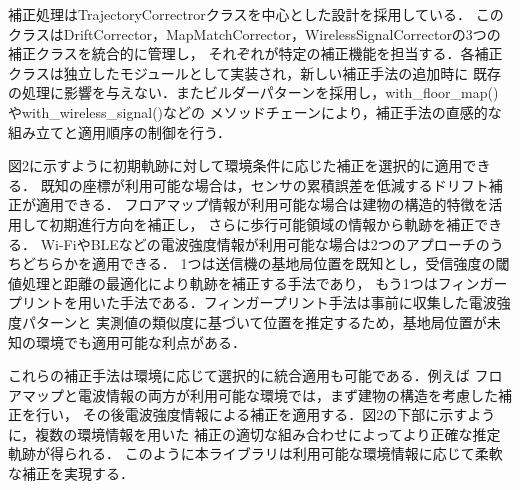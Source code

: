 \documentclass[a4paper, 10pt, twocolumn]{jarticle}
\begin{document}
補正処理はTrajectoryCorrectrorクラスを中心とした設計を採用している．
このクラスはDriftCorrector，MapMatchCorrector，WirelessSignalCorrectorの3つの補正クラスを統合的に管理し，
それぞれが特定の補正機能を担当する．各補正クラスは独立したモジュールとして実装され，新しい補正手法の追加時に
既存の処理に影響を与えない．またビルダーパターンを採用し，with\_floor\_map()やwith\_wireless\_signal()などの
メソッドチェーンにより，補正手法の直感的な組み立てと適用順序の制御を行う．

図2に示すように初期軌跡に対して環境条件に応じた補正を選択的に適用できる．
既知の座標が利用可能な場合は，センサの累積誤差を低減するドリフト補正が適用できる．
フロアマップ情報が利用可能な場合は建物の構造的特徴を活用して初期進行方向を補正し，
さらに歩行可能領域の情報から軌跡を補正できる．
Wi-FiやBLEなどの電波強度情報が利用可能な場合は2つのアプローチのうちどちらかを適用できる．
1つは送信機の基地局位置を既知とし，受信強度の閾値処理と距離の最適化により軌跡を補正する手法であり，
もう1つはフィンガープリントを用いた手法である．フィンガープリント手法は事前に収集した電波強度パターンと
実測値の類似度に基づいて位置を推定するため，基地局位置が未知の環境でも適用可能な利点がある．


これらの補正手法は環境に応じて選択的に統合適用も可能である．例えば
フロアマップと電波情報の両方が利用可能な環境では，まず建物の構造を考慮した補正を行い，
その後電波強度情報による補正を適用する．図2の下部に示すように，複数の環境情報を用いた
補正の適切な組み合わせによってより正確な推定軌跡が得られる．
このように本ライブラリは利用可能な環境情報に応じて柔軟な補正を実現する．%
\end{document}
